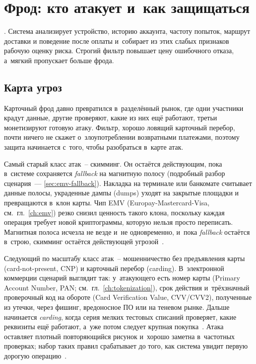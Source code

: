 
\chapter{Фрод: кто атакует и~как защищаться}\label{ch:fraud}
. Система анализирует устройство,
историю аккаунта, частоту попыток, маршрут доставки и поведение после
оплаты и~собирает из этих слабых признаков рабочую оценку риска.
Строгий фильтр повышает цену ошибочного отказа, а~мягкий пропускает
больше фрода.

\section{Карта угроз}\label{sec:fraud-threats}

Карточный фрод давно превратился в~разделённый рынок, где одни
участники крадут данные, другие проверяют, какие из них ещё работают,
третьи монетизируют готовую атаку. Фильтр, хорошо ловящий карточный
перебор, почти ничего не скажет о~злоупотреблении возвратными платежами,
поэтому защита начинается с~того, чтобы разобраться в~карте атак.

Самый старый класс атак~-- скимминг. Он остаётся действующим, пока
в~системе сохраняется \textit{fallback} на магнитную полосу
(подробный разбор сценария~--- \autoref{sec:emv-fallback}). Накладка
на терминале или банкомате считывает данные полосы, украденные дампы
(dumps) уходят на закрытые площадки и превращаются в~клон карты. Чип
EMV (Europay-Mastercard-Visa, см.~гл.~\ref{ch:emv}) резко снизил
ценность такого клона, поскольку каждая операция требует
новой криптограммы, которую нельзя просто переписать. Магнитная полоса
исчезла не везде и~не одновременно, и~пока \textit{fallback} остаётся в~строю, скимминг
остаётся действующей угрозой~\cite{emvco-book1}.

Следующий по масштабу класс атак~-- мошенничество без предъявления
карты (card-not-present, CNP) и карточный перебор (carding).
В~электронной коммерции сценарий выглядит так: у~атакующего
есть номер карты (Primary Account Number, PAN; см.~гл.~\ref{ch:tokenization}),
срок действия и~трёхзначный проверочный код на обороте
(Card Verification Value, CVV/CVV2), полученные из утечки, через фишинг,
вредоносное ПО или на теневом рынке. Дальше начинается \textit{carding},
когда серия мелких тестовых списаний проверяет, какие реквизиты ещё работают,
а~уже потом следует крупная покупка~\cite{mc-fraudulent-merchants-2025}.
Атака оставляет плотный повторяющийся рисунок и~хорошо заметна
в~частотных проверках; набор таких правил срабатывает до того,
как система увидит первую дорогую
операцию~\cite{visa-auth-management-2020}.

